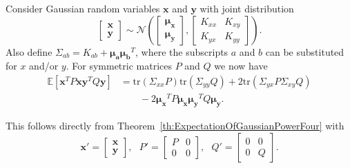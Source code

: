 \documentclass[twocolumn]{autart}
\newcommand{\ve}[1]{{\boldsymbol{#1}}} \newcommand{\tr}{\mbox{tr}} \newcommand{\ex}{\mathds{E}} \newcommand{\va}{\mathds{V}}
\begin{document}
\begin{thm}\label{th:ExpectationOfDifferentGaussianPowerFour}
Consider Gaussian random variables $\ve{x}$ and $\ve{y}$ with joint distribution
\begin{equation}
\begin{bmatrix}
\ve{x} \\
\ve{y}
\end{bmatrix} \sim \mathcal{N}\left(\begin{bmatrix}
\ve{\mu_x} \\
\ve{\mu_y}
\end{bmatrix}, \begin{bmatrix}
K_{xx} & K_{xy} \\
K_{yx} & K_{yy}
\end{bmatrix}\right).
\end{equation}
Also define $\Sigma_{ab} = K_{ab} + \ve{\mu_a}\ve{\mu_b}^T$, where the subscripts $a$ and $b$ can be substituted for $x$ and/or $y$. For symmetric matrices $P$ and $Q$ we now have
\begin{align}
\ex[\ve{x}^T P \ve{x} \ve{y}^T Q \ve{y}] & = \tr(\Sigma_{xx} P)\tr(\Sigma_{yy} Q) + 2\tr(\Sigma_{yx} P \Sigma_{xy} Q) \nonumber \\
& \hspace{24pt} - 2\ve{\mu_x}^T P \ve{\mu_x} \ve{\mu_y}^T Q \ve{\mu_y}.
\end{align}
\end{thm}
\begin{pf}
This follows directly from Theorem~\ref{th:ExpectationOfGaussianPowerFour} with
\begin{equation}
\ve{x'} = \begin{bmatrix}
\ve{x} \\
\ve{y}
\end{bmatrix}, \hspace{8pt} P' = \begin{bmatrix}
P & 0 \\
0 & 0
\end{bmatrix}, \hspace{8pt} Q' = \begin{bmatrix}
0 & 0 \\
0 & Q
\end{bmatrix}.
\end{equation}
\end{pf}

        

\end{document}
